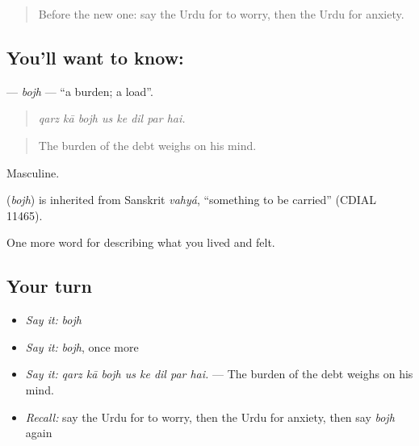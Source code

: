 \label{lesson:UR-C446-bojh}



\begin{quote}
Before the new one: say the Urdu for to worry, then the Urdu for anxiety.
\end{quote}

\subsection*{You'll want to know: }
\textbf{} — \emph{bojh} — \textquotedblleft{}a burden; a load\textquotedblright{}.

\begin{quote}
       
\end{quote}

\begin{quote}
\emph{qarz kā bojh us ke dil par hai.}
\end{quote}

\begin{quote}
The burden of the debt weighs on his mind.
\end{quote}

Masculine.

\begin{cousinweb}
\textbf{} (\emph{bojh}) is inherited from Sanskrit \emph{vahyá}, \textquotedblleft{}something to be carried\textquotedblright{} (CDIAL 11465).
\end{cousinweb}

\begin{grammarlens}[title={What you've built}]
One more word for describing what you lived and felt.
\end{grammarlens}

\subsection*{Your turn}
\begin{itemize}
\raggedright
  \item \emph{Say it:} \emph{bojh}
  \item \emph{Say it:} \emph{bojh}, once more
  \item \emph{Say it:} \emph{qarz kā bojh us ke dil par hai.} — The burden of the debt weighs on his mind.
  \item \emph{Recall:} say the Urdu for to worry, then the Urdu for anxiety, then say \emph{bojh} again
\end{itemize}

